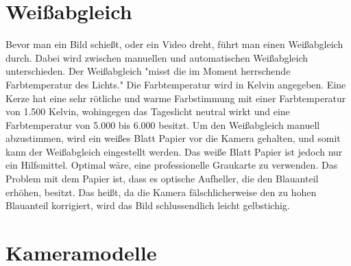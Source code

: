 \section{Weißabgleich}
Bevor man ein Bild schießt, oder ein Video dreht, führt man einen Weißabgleich durch. Dabei wird zwischen manuellen und automatischen Weißabgleich unterschieden. Der Weißabgleich "misst die im Moment herrschende Farbtemperatur des Lichts." Die Farbtemperatur wird in Kelvin angegeben. Eine Kerze hat eine sehr rötliche und warme Farbstimmung mit einer Farbtemperatur von 1.500 Kelvin, wohingegen das Tageslicht neutral wirkt und eine Farbtemperatur von 5.000 bis 6.000 besitzt. Um den Weißabgleich manuell abzustimmen, wird ein weißes Blatt Papier vor die Kamera gehalten, und somit kann der Weißabgleich eingestellt werden. Das weiße Blatt Papier ist jedoch nur ein Hilfsmittel. Optimal wäre, eine professionelle Graukarte zu verwenden. Das Problem mit dem Papier ist, dass es optische Aufheller, die den Blauanteil erhöhen, besitzt. Das heißt, da die Kamera fälschlicherweise den zu hohen Blauanteil korrigiert, wird das Bild schlussendlich leicht gelbstichig. 
\section{Kameramodelle}
